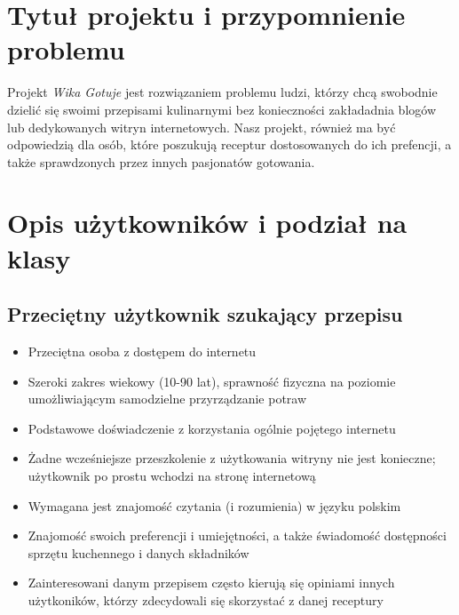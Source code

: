 \documentclass{article}
\begin{document}
\section{Tytuł projektu i przypomnienie problemu}
Projekt \textit{Wika Gotuje} jest rozwiązaniem problemu ludzi, którzy chcą swobodnie dzielić się swoimi przepisami kulinarnymi bez konieczności zakładadnia blogów lub dedykowanych 
witryn internetowych. Nasz projekt, również ma być odpowiedzią dla osób, które poszukują receptur dostosowanych do ich prefencji, a także sprawdzonych przez innych pasjonatów gotowania.

\section{Opis użytkowników i podział na klasy}
\subsection{Przeciętny użytkownik szukający przepisu}
  \begin{itemize}
    \item Przeciętna osoba z dostępem do internetu
    \item Szeroki zakres wiekowy (10-90 lat), sprawność fizyczna na poziomie umożliwiającym samodzielne przyrządzanie potraw
    \item Podstawowe doświadczenie z korzystania ogólnie pojętego internetu
    \item Żadne wcześniejsze przeszkolenie z użytkowania witryny nie jest konieczne; użytkownik po prostu wchodzi na stronę internetową
    \item Wymagana jest znajomość czytania (i rozumienia) w języku polskim
    \item Znajomość swoich preferencji i umiejętności, a także świadomość dostępności sprzętu kuchennego i danych składników
    \item Zainteresowani danym przepisem często kierują się opiniami innych użytkoników, którzy zdecydowali się skorzystać z danej receptury
  \end{itemize}
\end{document}
